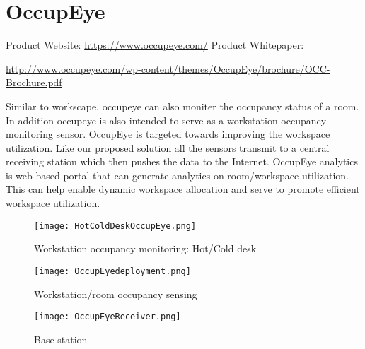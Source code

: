 \section{OccupEye}

Product Website:
\url{https://www.occupeye.com/}
\newline
Product Whitepaper: 

\url{http://www.occupeye.com/wp-content/themes/OccupEye/brochure/OCC-Brochure.pdf}

Similar to workscape, occupeye can also moniter the occupancy status of a room. In addition occupeye is also intended to serve as a workstation occupancy monitoring sensor.
OccupEye is targeted towards improving the workspace utilization.
Like our proposed solution all the sensors transmit to a central receiving station which then pushes the data to the Internet. OccupEye analytics is web-based portal that can generate analytics on room/workspace utilization. This can help enable dynamic workspace allocation and serve to promote efficient workspace utilization.

\begin{figure}[ht]
\begin{center}
	
\vspace{20pt}
	
\texttt{[image: HotColdDeskOccupEye.png]}
\caption{Workstation occupancy monitoring: Hot/Cold desk}

\vspace{40pt}

\texttt{[image: OccupEyedeployment.png]}
\caption{Workstation/room occupancy sensing}

\vspace{40pt}

\texttt{[image: OccupEyeReceiver.png]}
\caption{Base station}

\end{center}
\end{figure}	